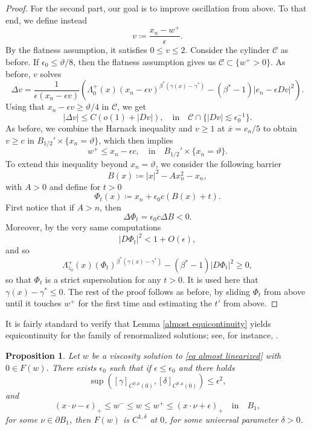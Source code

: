 \documentclass[reqno,11pt]{amsart}
\newtheorem{proposition}{Proposition}[section]
\newcommand{\1}{\mathds{1}}
\numberwithin{equation}{section}
\begin{document}
\begin{proof}
\medskip
For the second part, our goal is to improve oscillation from above. To that end, we define instead
$$
    v \coloneqq \frac{x_n - w^+}{\epsilon}.
$$
By the flatness assumption, it satisfies $0 \leq v \leq 2$. Consider the cylinder $\mathcal{C}$ as before. If $\epsilon_0 \leq \vartheta/8$, then the flatness assumption gives us $\mathcal{C} \subset \{ w^+>0\}$. As before, $v$ solves
$$
    \Delta v = \frac{1}{\epsilon (x_n - \epsilon v)}\left(\Lambda^+_{0}(x)(x_n - \epsilon v)^{\beta^\ast(\gamma(x)-\gamma^\ast)} - (\beta^\ast - 1)|e_n - \epsilon Dv|^2 \right).
$$
Using that $x_n - \epsilon v \geq \vartheta/4$ in $\mathcal{C}$, we get
$$
    |\Delta v| \leq C(o(1) + |Dv|), \quad \text{in} \quad \mathcal{C} \cap \{|Dv| \lesssim \epsilon_0^{-1}\}.
$$
As before, we combine the Harnack inequality and $v \geq 1$ at $\overline{x} = e_n/5$ to obtain $v \geq c$ in $B_{1/2}' \times \{x_n = \vartheta \}$, which then implies
\begin{equation}\label{bound from above harnack}
    w^+ \leq x_n - \epsilon c, \quad \text{in} \quad B_{1/2}' \times \{x_n = \vartheta \}.
\end{equation}
To extend this inequality beyond $x_n = \vartheta$, we consider the following barrier
$$
    B(x) \coloneqq |x|^2 - Ax_n^2 - x_n,
$$
with $A>0$ and define for $t>0$
$$
    \Phi_t(x) \coloneqq x_n + \epsilon_0 c(B(x) + t).
$$
First notice that if $A > n$, then
$$
    \Delta \Phi_t = \epsilon_0 c \Delta B < 0.
$$
Moreover, by the very same computations
$$
    |D\Phi_t|^2  < 1 + O(\epsilon),
$$
and so
$$
    \Lambda^+_{z_0}(x)(\Phi_t)^{\beta^\ast(\gamma(x)-\gamma^\ast)} - (\beta^\ast - 1)|D\Phi_t|^2 \geq 0,
$$
so that $\Phi_t$ is a strict supersolution for any $t>0$. It is used here that $\gamma(x) - \gamma^\ast \leq 0$. The rest of the proof follows as before, by sliding $\Phi_t$ from above until it touches $w^+$ for the first time and estimating the $t'$ from above.
\end{proof}

It is fairly standard to verify that Lemma \ref{almost equicontinuity} yields equicontinuity for the family of renormalized solutions; see, for instance, \cite{DSS}.

\begin{proposition}\label{mco airport}
Let $w$ be a viscosity solution to \eqref{eq almost linearized} with $0 \in F(w)$. There exists $\epsilon_0$ such that if $\epsilon \leq \epsilon_0$ and there holds
$$
    \sup\left([\gamma]_{C^{0,\mu}(0)}, [\delta]_{C^{0,\mu}(0)}\right) \leq \epsilon^2,
$$ 
and
$$
    (x \cdot \nu - \epsilon)_+ \leq w^- \leq w \leq w^+ \leq (x \cdot \nu + \epsilon)_+ \quad \text{in} \quad B_1,
$$
for some $\nu \in \partial B_1$, then $F(w)$ is $C^{1,\delta}$ at $0$, for some universal parameter $\delta>0$.
\end{proposition}
\end{document}
